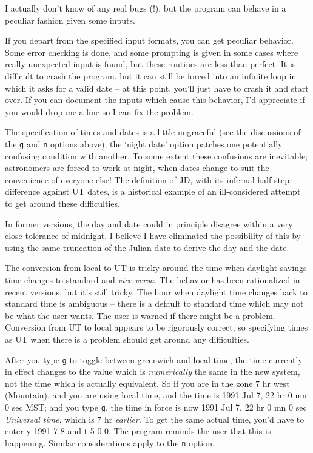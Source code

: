 
I actually don't know of any real bugs (!), but the program
can behave in a peculiar fashion given some inputs.

If you depart from the specified input formats, you can get 
peculiar behavior.  Some error checking is done, and some prompting
is given in some cases where really unexpected input is found, but
these routines are less than perfect.  It is difficult
to crash the program, but it can still be forced into an 
infinite loop in which it asks for a valid date -- at this point,
you'll just have to crash it and start over.  If you can 
document the inputs which cause this behavior, I'd appreciate
if you would drop me a line so I can fix the problem.

The specification of times and dates is a little ungraceful (see the
discussions of the {\tt g} and {\tt n} options above); the
`night date' option patches one potentially confusing condition with another.
To some extent these confusions are inevitable; astronomers are forced to
work at night, when dates change to suit the convenience of
everyone else!  The definition of JD, with its infernal half-step
difference against UT dates, is a historical example of an ill-considered
attempt to get around these difficulties.  

In former versions, the day and date could in principle disagree 
within a very close tolerance of midnight.  I believe I have
eliminated the possibility of this by using the same truncation
of the Julian date to derive the day and the date.

The conversion from local to UT is tricky around
the time when daylight savings time changes to standard
and {\it vice versa}.  The behavior has been rationalized in 
recent versions, but it's still tricky.  The hour when 
daylight time changes back to standard time is ambiguous -- there
is a default to standard time which may not be what the user wants.  
The user is warned if
there might be a problem.  Conversion from UT to local appears
to be rigorously correct, so specifying times as UT when there
is a problem should get around any difficulties.

After you type {\tt g} to toggle between greenwich and local
time, the time currently in effect changes to the value
which is {\it numerically} the same in the new system, not the
time which is actually equivalent.  So if you are in the zone
7 hr west (Mountain), and you are using local time, and
the time is 1991 Jul 7, 22 hr 0 mn 0 sec MST; and you type {\tt g},
the time in force is now 1991 Jul 7, 22 hr 0 mn 0 sec {\it Universal time},
which is 7 hr {\it earlier}.  To get the same actual time, you'd have to
enter y 1991 7 8 and t 5 0 0.  The program reminds the user
that this is happening.  Similar considerations apply to the
{\tt n} option.

